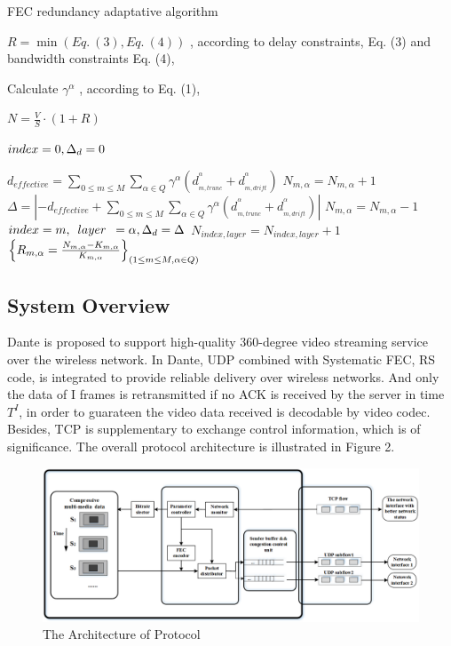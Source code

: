 \begin{algorithm}[!h] 
	\scriptsize
	\centering 
	\caption{FEC redundancy adaptative algorithm}%
	\begin{algorithmic}[1]%
		\STATE $R = \min (Eq.~(3), Eq.~(4))$ , according to delay constraints, Eq. (3) and
		bandwidth constraints Eq. (4),
		
		\STATE Calculate $\gamma ^\alpha$ , according to Eq. (1),
		
		\ENDFOR
		
		\STATE $N = \frac{V}{S} \cdot (1+R)$ 
		
		\STATE $index{\rm{ }} = {\rm{ }}0,{\rm{ }}{\Delta _d}{\rm{ }} = 0$
		
		\STATE ${d_{effective}} = \sum\limits_{0 \le m \le M} {\sum\limits_{\alpha 
				\in Q} {{\gamma ^\alpha }(d_{_{m,trunc}}^{^\alpha } + d_{_{m,drift}}^{^\alpha
				})} } $
		\STATE ${N_{m,\alpha }} = {N_{m,\alpha }} + 1$
		\STATE $\Delta  = \left| { - {d_{effective}} + \sum\limits_{0 \le m \le M}
			{\sum\limits_{\alpha  \in Q} {{\gamma ^\alpha }(d_{_{m,trunc}}^{^\alpha } +
					d_{_{m,drift}}^{^\alpha })} } } \right|$
		\STATE ${N_{m,\alpha }} = {N_{m,\alpha }} - 1$
		\STATE $index{\rm{ }} = m,\begin{array}{*{20}{c}}
		{layer}
		\end{array} = \alpha ,{\Delta _d} = \Delta$
		\ENDIF
		\ENDFOR 
		\ENDFOR
		\STATE ${N_{index, layer }} = {N_{index, layer }} + 1$
		\ENDFOR
		\RETURN${\left\{ {{R_{m,\alpha }} = \frac{{{N_{m,\alpha }}{\rm{ - }}{K_{m,\alpha }}}}{{{K_{m,\alpha }}}}} \right\}_{(1 \le m \le M,\alpha  \in Q)}}$
	\end{algorithmic}  
\end{algorithm} 




\subsection{System Overview}

Dante is proposed to support high-quality 360-degree video
streaming service over the wireless network. In Dante, UDP combined with Systematic FEC, RS code, is integrated to provide reliable delivery over wireless networks. And only the data of I frames is retransmitted if no ACK is received by the server in time ${T^I}$, in order to guarateen the video data received is decodable by video codec.
Besides, TCP is supplementary to exchange control information, which is of significance. The overall protocol architecture is illustrated in Figure 2.

\begin{figure}[ht]
	\centering
	\includegraphics[scale=0.4]{paper_figs/architecture_V2.png}
	\caption{The Architecture of Protocol}
	\label{paper_figs:pathdemo}
\end{figure}
